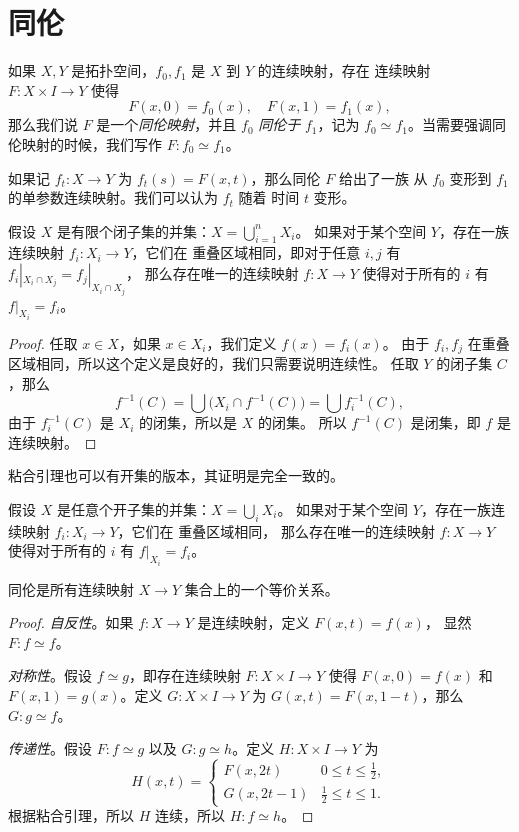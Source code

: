\documentclass[fontset=none]{Notes}
\begin{document}
\section{同伦}

\begin{definition}
  如果 $X,Y$ 是拓扑空间，$f_0,f_1$ 是 $X$ 到 $Y$ 的连续映射，存在
  连续映射 $F:X\times I\to Y$ 使得
  \[
    F(x,0)=f_0(x),\quad F(x,1)=f_1(x),
  \]
  那么我们说 $F$ 是一个\emph{同伦映射}，并且 $f_0$ \emph{同伦于}
  $f_1$，记为 $f_0\simeq f_1$。当需要强调同伦映射的时候，我们写作
  $F:f_0\simeq f_1$。
\end{definition}

如果记 $f_t:X\to Y$ 为 $f_t(s)=F(x,t)$，那么同伦 $F$ 给出了一族
从 $f_0$ 变形到 $f_1$ 的单参数连续映射。我们可以认为 $f_t$ 随着
时间 $t$ 变形。

\begin{lemma}[粘连引理]
  假设 $X$ 是有限个闭子集的并集：$X=\bigcup_{i=1}^n X_i$。
  如果对于某个空间 $Y$，存在一族连续映射 $f_i:X_i\to Y$，它们在
  重叠区域相同，即对于任意 $i,j$ 有 $f_i|_{X_i\cap X_j}=f_j|_{X_i\cap X_j}$，
  那么存在唯一的连续映射 $f:X\to Y$ 使得对于所有的 $i$ 有 $f|_{X_i}=f_i$。
\end{lemma}
\begin{proof}
  任取 $x\in X$，如果 $x\in X_i$，我们定义 $f(x)=f_i(x)$。
  由于 $f_i,f_j$ 在重叠区域相同，所以这个定义是良好的，我们只需要说明连续性。
  任取 $Y$ 的闭子集 $C$，那么
  \begin{equation*}
    f^{-1}(C)=\bigcup\bigl(X_i\cap f^{-1}(C)\bigr)=
    \bigcup f_i^{-1}(C),
  \end{equation*}
  由于 $f_i^{-1}(C)$ 是 $X_i$ 的闭集，所以是 $X$ 的闭集。
  所以 $f^{-1}(C)$ 是闭集，即 $f$ 是连续映射。
\end{proof}

粘合引理也可以有开集的版本，其证明是完全一致的。

\begin{lemma}{}{}
  假设 $X$ 是任意个开子集的并集：$X=\bigcup_i X_i$。
  如果对于某个空间 $Y$，存在一族连续映射 $f_i:X_i\to Y$，它们在
  重叠区域相同，
  那么存在唯一的连续映射 $f:X\to Y$ 使得对于所有的 $i$ 有 $f|_{X_i}=f_i$。
\end{lemma}

\begin{theorem}
  同伦是所有连续映射 $X\to Y$ 集合上的一个等价关系。
\end{theorem}
\begin{proof}
  \emph{自反性}。如果 $f:X\to Y$ 是连续映射，定义 $F(x,t)=f(x)$，
  显然 $F:f\simeq f$。

  \emph{对称性}。假设 $f\simeq g$，即存在连续映射 $F:X\times I\to Y$
  使得 $F(x,0)=f(x)$ 和 $F(x,1)=g(x)$。定义 $G:X\times I\to Y$
  为 $G(x,t)=F(x,1-t)$，那么 $G:g\simeq f$。

  \emph{传递性}。假设 $F:f\simeq g$ 以及 $G:g\simeq h$。定义
  $H:X\times I\to Y$ 为
  \[
    H(x,t)=\begin{cases}
      F(x,2t) & 0\leq t\leq \frac{1}{2},\\
      G(x,2t-1) & \frac{1}{2}\leq t\leq 1.
    \end{cases}
  \]
  根据粘合引理，所以 $H$ 连续，所以 $H:f\simeq h$。
\end{proof}
\end{document}
